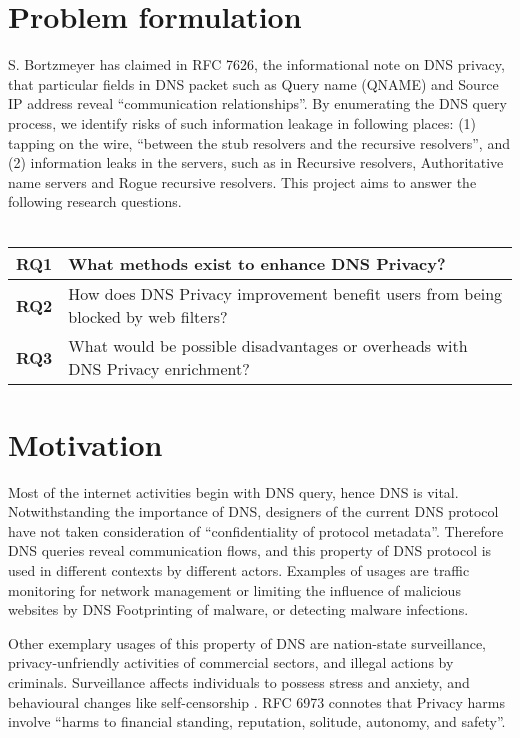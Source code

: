 \documentclass[a4paper,12pt]{article}
\begin{document}
\section*{Problem formulation}
S. Bortzmeyer has claimed in RFC 7626, the informational note on DNS privacy\cite{rfc7626}, that particular fields in DNS packet\cite{rfc1035} such as Query name  (QNAME) and Source IP address reveal ``communication relationships''. By enumerating the DNS query process, we identify risks of such information leakage in following places: (1) tapping on the wire, ``between the stub resolvers and the recursive resolvers'', and (2) information leaks in the servers, such as in Recursive resolvers, Authoritative name servers and Rogue recursive resolvers. This project aims to answer the following research questions.
\\\\
\begin{tabular} {|p{1.2cm}|p{12.9cm}|} \hline
  \textbf{RQ1} & What methods exist to enhance DNS Privacy? \\ \hline
  \textbf{RQ2} & How does DNS Privacy improvement benefit users from being blocked by web filters?\\ \hline
  \textbf{RQ3} & What would be possible disadvantages or overheads with DNS Privacy enrichment? \\ \hline
  \end{tabular}


\section*{Motivation}
Most of the internet activities begin with DNS query, hence DNS is vital. Notwithstanding the importance of DNS, designers of the current DNS protocol have not taken consideration of ``confidentiality of protocol metadata''. Therefore DNS queries reveal communication flows, and this property of DNS protocol is used in different contexts by different actors. Examples of usages are traffic monitoring for network management or limiting the influence of malicious websites by DNS Footprinting of malware\cite{stoner2010dns}, or detecting malware infections\cite{lemos2013got}.

Other exemplary usages of this property of DNS are nation-state surveillance, privacy-unfriendly activities of commercial sectors\cite{weaver2011redirecting}, and illegal actions by criminals. Surveillance affects individuals to possess stress and anxiety\cite{oulasvirta2012long}, and behavioural changes like self-censorship \cite{rfc6973}. RFC 6973 connotes that Privacy harms involve ``harms to financial standing, reputation, solitude, autonomy, and safety\cite{rfc6973}''.
\end{document}
